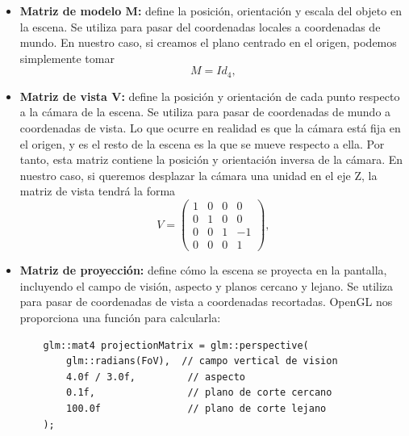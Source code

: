 \begin{itemize}
    \item \textbf{Matriz de modelo $\boldsymbol{M}$:} define la posición, orientación y escala del objeto en la escena. Se utiliza para pasar del coordenadas locales a coordenadas de mundo. En nuestro caso, si creamos el plano centrado en el origen, podemos simplemente tomar
    \begin{equation*}
        M = Id_{4},
    \end{equation*}
    \item \textbf{Matriz de vista  $\boldsymbol{V}$:} define la posición y orientación de cada punto respecto a la cámara de la escena. Se utiliza para pasar de coordenadas de mundo a coordenadas de vista. Lo que ocurre en realidad es que la cámara está fija en el origen, y es el resto de la escena es la que se mueve respecto a ella. Por tanto, esta matriz contiene la posición y orientación inversa de la cámara. En nuestro caso, si queremos desplazar la cámara una unidad en el eje Z, la matriz de vista tendrá la forma
    \begin{equation*}
        V = \begin{pmatrix}
        1 & 0 & 0 & 0\\
        0 & 1 & 0 & 0\\
        0 & 0 & 1 & -1\\
        0 & 0 & 0 & 1
        \end{pmatrix},
    \end{equation*}
    
    \item \textbf{Matriz de proyección:} define cómo la escena se proyecta en la pantalla, incluyendo el campo de visión, aspecto y planos cercano y lejano. Se utiliza para pasar de coordenadas de vista a coordenadas recortadas. OpenGL nos proporciona una función para calcularla:
    \begin{lstlisting}
    glm::mat4 projectionMatrix = glm::perspective(
        glm::radians(FoV),  // campo vertical de vision
        4.0f / 3.0f,         // aspecto
        0.1f,                // plano de corte cercano
        100.0f               // plano de corte lejano
    );
    \end{lstlisting}
\end{itemize}

